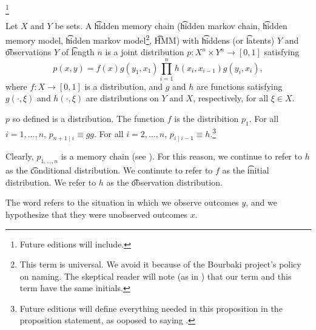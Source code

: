 
\footnote{Future editions will include.}


Let $X$ and $Y$ be sets.
A \t{hidden memory chain} (\t{hidden markov chain}, \t{hidden memory model}, \t{hidden markov model}\footnote{This term is universal. We avoid it because of the Bourbaki project's policy on naming. The skeptical reader will note (as in ) that our term and this term have the same initials.}, \t{HMM}) with \t{hiddens} (or \t{latents}) $Y$ and \t{observations} $Y$ of \t{length} $n$ is a joint distribution $p: X^n \times Y^n \to [0, 1]$ satisfying
\[
  p(x, y) = f(x)g(y_1, x_1)\prod_{i = 1}^{n} h(x_i, x_{i-1}) g(y_i, x_i),
\]
where $f: X \to [0, 1]$ is a distribution, and $g$ and $h$ are functions satisfying $g(\cdot, \xi)$ and $h(\cdot, \xi)$ are distributions on $Y$ and $X$, respectively, for all $\xi \in X$.
\begin{proposition}
  $p$ so defined is a distribution.
  The function $f$ is the distribition $p_{1}$.
  For all $i = 1, \dots, n$, $p_{n+1 \mid i} \equiv gg$.
  For all $i = 2, \dots, n$, $p_{i \mid i-1} \equiv h$.\footnote{Future editions will define everything needed in this proposition in the proposition statement, as ooposed to saying .}
\end{proposition}

Clearly, $p_{1, \dots, n}$ is a memory chain (see ).
For this reason, we continue to refer to $h$ as the \t{conditional distribution}.
We continute to refer to $f$ as the \t{initial distribution}.
We refer to $h$ as the \t{observation distribution}.

The word  refers to the situation in which we observe outcomes $y$, and we hypothesize that they were  unobserved outcomes $x$.



